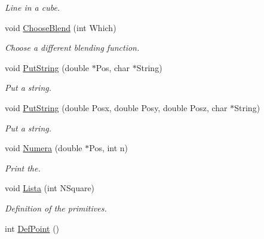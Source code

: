 \begin{DoxyCompactItemize}
\begin{DoxyCompactList}\small\item\em \-Line in a cube. \end{DoxyCompactList}\item 
\hypertarget{classDraw_affbc65c5c21480f96c44a3a007eab346}{void \hyperlink{classDraw_affbc65c5c21480f96c44a3a007eab346}{\-Choose\-Blend} (int \-Which)}\label{classDraw_affbc65c5c21480f96c44a3a007eab346}

\begin{DoxyCompactList}\small\item\em \-Choose a different blending function. \end{DoxyCompactList}\item 
\hypertarget{classDraw_a54d1e606bdbeb32edce52a58531b9a1c}{void \hyperlink{classDraw_a54d1e606bdbeb32edce52a58531b9a1c}{\-Put\-String} (double $\ast$\-Pos, char $\ast$\-String)}\label{classDraw_a54d1e606bdbeb32edce52a58531b9a1c}

\begin{DoxyCompactList}\small\item\em \-Put a string. \end{DoxyCompactList}\item 
\hypertarget{classDraw_af8297bf0b592efa35fb5b8e62ecf9c29}{void \hyperlink{classDraw_af8297bf0b592efa35fb5b8e62ecf9c29}{\-Put\-String} (double \-Posx, double \-Posy, double \-Posz, char $\ast$\-String)}\label{classDraw_af8297bf0b592efa35fb5b8e62ecf9c29}

\begin{DoxyCompactList}\small\item\em \-Put a string. \end{DoxyCompactList}\item 
void \hyperlink{classDraw_a7a0fab2975ffd1787c0d9168f5a8574c}{\-Numera} (double $\ast$\-Pos, int n)
\begin{DoxyCompactList}\small\item\em \-Print the. \end{DoxyCompactList}\item 
\hypertarget{classDraw_ac5e4238325fb9dde3862a6f1053b5e8d}{void \hyperlink{classDraw_ac5e4238325fb9dde3862a6f1053b5e8d}{\-Lista} (int \-N\-Square)}\label{classDraw_ac5e4238325fb9dde3862a6f1053b5e8d}

\begin{DoxyCompactList}\small\item\em \-Definition of the primitives. \end{DoxyCompactList}\item 
\hypertarget{classDraw_a318bab761ab1ad340c3a7d2d17df4f9b}{int \hyperlink{classDraw_a318bab761ab1ad340c3a7d2d17df4f9b}{\-Def\-Point} ()}\label{classDraw_a318bab761ab1ad340c3a7d2d17df4f9b}


\end{DoxyCompactItemize}
